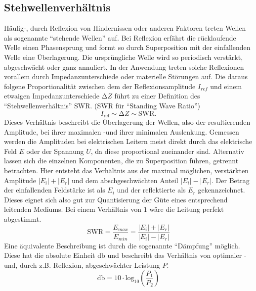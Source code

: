 \subsection{Stehwellenverhältnis} 
Häufig-, durch Reflexion von Hindernissen oder anderen Faktoren treten Wellen als sogenannte \enquote{stehende Wellen} auf. %
Bei Reflexion erfährt die rücklaufende Welle einen Phasensprung und formt so durch Superposition mit der einfallenden Welle eine Überlagerung. Die ursprüngliche Welle wird so periodisch verstärkt, abgeschwächt oder ganz annuliert. 
In der Anwendung treten solche Reflexionen vorallem durch Impedanzunterschiede oder materielle Störungen auf. Die daraus folgene Proportionalität zwischen dem der Reflexionsamplitude $I_{ref}$ und einem etwaigen Impedanzunterschiede $\increment Z$
führt zu einer Definition des \enquote{Stehwellenverhältnis} SWR. (SWR für \enquote{Standing Wave Ratio}) 
\begin{equation*}
    I_{\text{ref}} \sim \increment Z \sim \text{SWR}.
\end{equation*}
Dieses Verhältnis beschreibt die Überlagerung der Wellen, also der resultierenden Amplitude, bei ihrer maximalen -und ihrer minimalen Auslenkung. 
Gemessen werden die Amplituden bei elektrischen Leitern meist direkt durch das elektrische Feld $E$ oder der Spannung $U$, da diese proportional zueinander sind.
Alternativ lassen sich die einzelnen Komponenten, die zu Superposition führen, getrennt betrachten. Hier entsteht das Verhältnis aus der maximal möglichen, verstärkten Amplitude $|E_i| + |E_r|$ und dem abschgeschwächten Anteil $|E_i| - |E_r|$.
Der Betrag der einfallenden Feldstärke ist als $E_i$ und der reflektierte als $E_r$ gekennzeichnet. Dieses eignet sich also gut zur Quantisierung der Güte eines entsprechend leitenden Mediums. Bei einem Verhältnis von $1$ wäre die Leitung perfekt abgestimmt.
\begin{equation*}
    \text{SWR} = \frac{E_{max}}{E_{min}} =  \frac{|E_i| + |E_r|}{|E_i| - |E_r|}
\end{equation*}
Eine äquivalente Beschreibung ist durch die sogenannte \enquote{Dämpfung} möglich. Diese hat die absolute Einheit $\si{\decibel}$ und beschreibt das Verhältnis von optimaler -und, durch z.B. Reflexion, abgeschwächter Leistung $P$. 
\begin{equation*}
    \si{\decibel} = 10 \cdot \text{log}_{10} \left(\frac{P_1}{P_2}\right)
\end{equation*}

